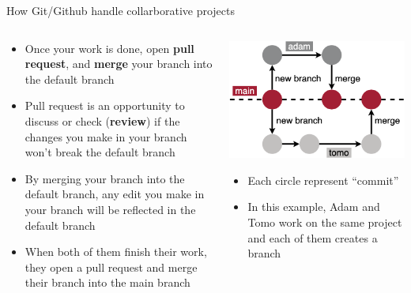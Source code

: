 \documentclass[handout,pdftex,10pt,aspectratio=169]{beamer}
\begin{document}
\begin{frame}{How Git/Github handle collarborative projects}
  \begin{columns}[c]
    \begin{column}{0.55\linewidth}
      \begin{itemize}[<+->] \setlength\itemsep{10pt}
        \item Once your work is done, open \textbf{pull request}, and \textbf{merge} your branch
        into the default branch
        \item Pull request is an opportunity to discuss or check (\textbf{review})
        if the changes you make in your branch won't break the default branch
        \item By merging your branch into the default branch, any edit you make in your branch
        will be reflected in the default branch
        \item When both of them finish their work, they open a pull request and 
        merge their branch into the main branch
      \end{itemize}
    \end{column} \hfill
    \begin{column}{0.44\linewidth}
      \includegraphics[width = \linewidth]{github_branch.png}
      \begin{itemize}
        \item Each circle represent ``commit''
        \item In this example, Adam and Tomo work on the same project and 
        each of them creates a branch
      \end{itemize}
    \end{column}
  \end{columns}
\end{frame}
\end{document}
